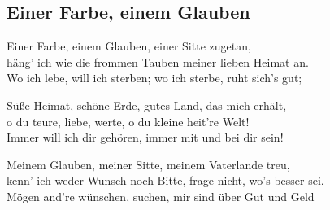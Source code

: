 
\subsection*{Einer Farbe, einem Glauben}
%
%


\thestrophe Einer Farbe, einem Glauben, einer Sitte zugetan, \\
häng' ich wie die frommen Tauben meiner lieben Heimat an. \\
Wo ich lebe, will ich sterben; wo ich sterbe, ruht sich's gut; \\

\thestrophe Süße Heimat, schöne Erde, gutes Land, das mich erhält, \\
o du teure, liebe, werte, o du kleine heit're Welt! \\
Immer will ich dir gehören, immer mit und bei dir sein! \\

\thestrophe Meinem Glauben, meiner Sitte, meinem Vaterlande treu, \\
kenn' ich weder Wunsch noch Bitte, frage nicht, wo's besser sei. \\
Mögen and're wünschen, suchen, mir sind über Gut und Geld \\
